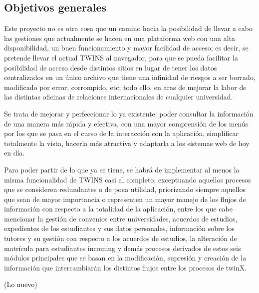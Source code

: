 \documentclass[12pt]{article}
\begin{document}
\subsection{Objetivos generales}

Este proyecto no es otra cosa que un camino hacia la posibilidad de llevar a cabo las gestiones que actualmente se hacen en una plataforma web con una alta disponibilidad, un buen funcionamiento y mayor facilidad de acceso; es decir, se pretende llevar el actual TWINS al navegador, para que se pueda facilitar la posibilidad de acceso desde distintos sitios en lugar de tener los datos centralizados en un único archivo que tiene una infinidad de riesgos a ser borrado, modificado por error, corrompido, etc; todo ello, en aras de mejorar la labor de las distintas oficinas de relaciones internacionales de cualquier universidad.

Se trata de mejorar y perfeccionar lo ya existente: poder consultar la información de una manera más rápida y efectiva, con una mayor comprensión de los menús por los que se pasa en el curso de la interacción con la aplicación, simplificar totalmente la vista, hacerla más atractiva y adaptarla a los sistemas web de hoy en día.

Para poder partir de lo que ya se tiene, se habrá de implementar al menos la misma funcionalidad de TWINS casi al completo, exceptuando aquellos procesos que se consideren redundantes o de poca utilidad, priorizando siempre aquellos que sean de mayor importancia o representen un mayor manejo de los flujos de información con respecto a la totalidad de la aplicación, entre los que cabe mencionar la gestión de convenios entre universidades, acuerdos de estudios, expedientes de los estudiantes y sus datos personales, información sobre los tutores y su gestión con respecto a los acuerdos de estudios, la alteración de matrícula para estudiantes incoming y demás procesos derivados de estos seis módulos principales que se basan en la modificación, supresión y creación de la información que intercambiarán los distintos flujos entre los procesos de twinX.

(Lo nuevo)


\newpage

\printglossaries

\newpage

\begin{appendices}

\end{appendices}
\end{document}
